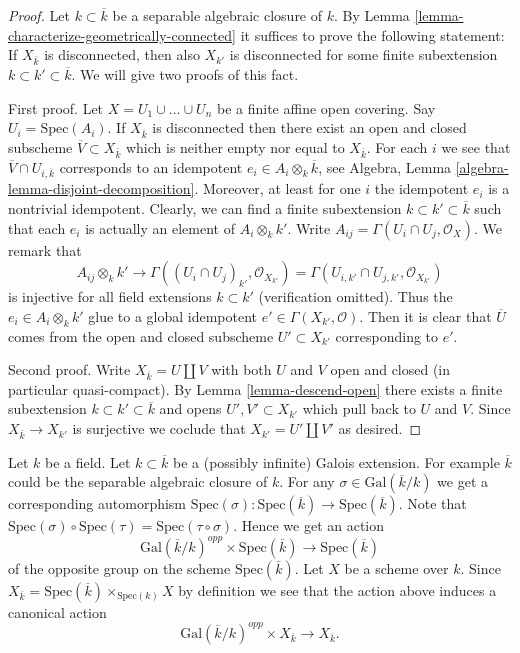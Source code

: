 \begin{proof}
Let $k \subset \overline{k}$ be a separable algebraic closure of $k$.
By Lemma \ref{lemma-characterize-geometrically-connected} it suffices
to prove the following statement:
If $X_{\overline{k}}$ is disconnected, then also $X_{k'}$ is
disconnected for some finite subextension $k \subset k' \subset \overline{k}$.
We will give two proofs of this fact.

\medskip\noindent
First proof.
Let $X = U_1 \cup \ldots \cup U_n$ be a finite affine open
covering. Say $U_i = \text{Spec}(A_i)$. If $X_{\overline{k}}$ is disconnected
then there exist an open and closed subscheme
$\overline{V} \subset X_{\overline{k}}$ which is neither empty
nor equal to $X_{\overline{k}}$. For each $i$ we see that
$\overline{V} \cap U_{i, \overline{k}}$ corresponds to an
idempotent $e_i \in A_i \otimes_k \overline{k}$, see
Algebra, Lemma \ref{algebra-lemma-disjoint-decomposition}. Moreover, at
least for one $i$ the idempotent $e_i$ is a nontrivial idempotent.
Clearly, we can find a finite subextension $k \subset k' \subset \overline{k}$
such that each $e_i$ is actually an element of $A_i \otimes_k k'$.
Write $A_{ij} = \Gamma(U_i \cap U_j, \mathcal{O}_X)$.
We remark that
$$
A_{ij} \otimes_k k'
\longrightarrow
\Gamma((U_i \cap U_j)_{k'}, \mathcal{O}_{X_{k'}})
=
\Gamma(U_{i, k'} \cap U_{j, k'}, \mathcal{O}_{X_{k'}})
$$
is injective for all field extensions $k \subset k'$ (verification omitted).
Thus the $e_i \in A_i \otimes_k k'$ glue to a global idempotent
$e' \in \Gamma(X_{k'}, \mathcal{O})$.
Then it is clear that $\overline{U}$ comes from the open and closed
subscheme $U' \subset X_{k'}$ corresponding to $e'$.

\medskip\noindent
Second proof.
Write $X_{\overline{k}} = U \coprod V$ with both $U$ and $V$ open and
closed (in particular quasi-compact).
By Lemma \ref{lemma-descend-open} there exists a finite subextension
$k \subset k' \subset \overline{k}$ and opens $U', V' \subset X_{k'}$
which pull back to $U$ and $V$. Since $X_{\overline{k}} \to X_{k'}$
is surjective we coclude that $X_{k'} = U' \coprod V'$ as desired.
\end{proof}

\noindent
Let $k$ be a field. Let $k \subset \overline{k}$ be a (possibly infinite)
Galois extension. For example $\overline{k}$ could be the
separable algebraic closure of $k$.
For any $\sigma \in \text{Gal}(\overline{k}/k)$ we get a corresponding
automorphism
$
\text{Spec}(\sigma) :
\text{Spec}(\overline{k})
\longrightarrow
\text{Spec}(\overline{k})
$.
Note that
$\text{Spec}(\sigma) \circ \text{Spec}(\tau) = \text{Spec}(\tau \circ \sigma)$.
Hence we get an action
$$
\text{Gal}(\overline{k}/k)^{opp} \times \text{Spec}(\overline{k})
\longrightarrow
\text{Spec}(\overline{k})
$$
of the opposite group on the scheme $\text{Spec}(\overline{k})$.
Let $X$ be a scheme over $k$. Since
$X_{\overline{k}} =
\text{Spec}(\overline{k}) \times_{\text{Spec}(k)} X$
by definition we see that the action above induces a canonical action
\begin{equation}
\label{equation-galois-action-base-change-kbar}
\text{Gal}(\overline{k}/k)^{opp} \times X_{\overline{k}}
\longrightarrow
X_{\overline{k}}.
\end{equation}

